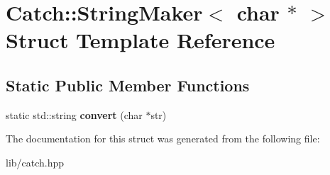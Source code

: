 \hypertarget{struct_catch_1_1_string_maker_3_01char_01_5_01_4}{}\section{Catch\+:\+:String\+Maker$<$ char $\ast$ $>$ Struct Template Reference}
\label{struct_catch_1_1_string_maker_3_01char_01_5_01_4}
\subsection*{Static Public Member Functions}
\begin{DoxyCompactItemize}
\item 
\mbox{\label{struct_catch_1_1_string_maker_3_01char_01_5_01_4_a33049e24281ea6fba48bd8817bdd52bd}} 
static std\+::string {\bfseries convert} (char $\ast$str)
\end{DoxyCompactItemize}


The documentation for this struct was generated from the following file\+:\begin{DoxyCompactItemize}
\item 
lib/catch.\+hpp\end{DoxyCompactItemize}
